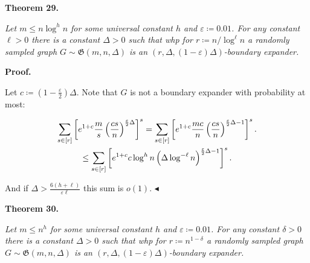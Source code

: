 \par\medskip\noindent\textbf{
\textbf{Theorem 29}\textbf{.}
}\par



\emph{Let $m\leq n\log^{h}n$ for some universal constant $h$ and $\varepsilon\coloneqq 0.01$. For any
constant $\ell>0$ there is a constant $\Delta>0$ such that whp for $r\coloneqq n/\log^{\ell}n$ a randomly sampled graph $G\sim\mathfrak{G}(m,n,\Delta)$ is an $(r,\Delta,(1-\varepsilon)\Delta)$-boundary expander.}\par







\par\medskip\noindent\textbf{Proof.}\par




Let $c\coloneqq(1-\frac{\varepsilon}{2})\Delta$. Note that $G$ is not a boundary expander with
probability at most:\par


\[\begin{gathered}
\displaystyle\sum\limits_{s\in[r]}\left[e^{1+c}\frac{m}{s}\left(\frac{cs}{n}%
\right)^{\frac{\varepsilon}{2}\Delta}\right]^{s} \displaystyle=\sum\limits_{s\in[r]}\left[e^{1+c}\frac{mc}{n}\left(\frac{cs}{n}%
\right)^{\frac{\varepsilon}{2}\Delta-1}\right]^{s}. \\
\displaystyle\leq\sum\limits_{s\in[r]}\left[e^{1+c}c\log^{h}n\left(\Delta\log^%
{-\ell}n\right)^{\frac{\varepsilon}{2}\Delta-1}\right]^{s}.
\end{gathered}\]


And if $\Delta>\frac{6(h+\ell)}{\varepsilon\ell}$ this sum is $o(1)$.
$\blacktriangleleft$\par





\par\medskip\noindent\textbf{
\textbf{Theorem 30}\textbf{.}
}\par



\emph{Let $m\leq n^{h}$ for some universal constant $h$ and $\varepsilon\coloneqq 0.01$. For any constant
$\delta>0$ there is a constant $\Delta>0$ such that whp for $r\coloneqq n^{1-\delta}$ a
randomly sampled graph $G\sim\mathfrak{G}(m,n,\Delta)$ is an $(r,\Delta,(1-\varepsilon)\Delta)$-boundary expander.}\par



